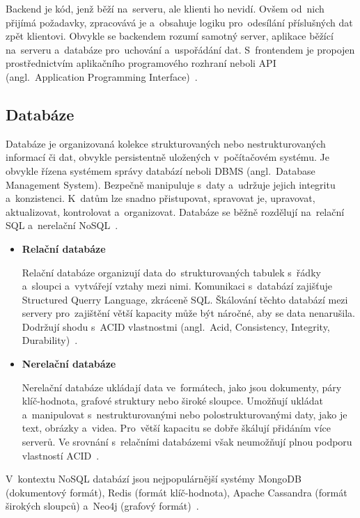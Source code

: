 \documentclass[twoside]{ctuthesis}
\begin{document}
Backend je kód, jenž běží na~serveru, ale klienti ho nevidí. Ovšem od~nich přijímá požadavky, zpracovává je a~obsahuje logiku pro~odesílání příslušných dat zpět klientovi. Obvykle se backendem rozumí samotný server, aplikace běžící na~serveru a~databáze pro~uchování a~uspořádání dat. S~frontendem je propojen prostřednictvím aplikačního programového rozhraní neboli API (angl.~Application Programming Interface)~\cite{codecademy}.

\subsection{Databáze}

Databáze je organizovaná kolekce strukturovaných nebo nestrukturovaných informací či dat, obvykle persistentně uložených v~počítačovém systému. Je obvykle řízena systémem správy databází neboli DBMS (angl.~Database Management System). Bezpečně manipuluje s~daty a~udržuje jejich integritu a~konzistenci. K~datům lze snadno přistupovat, spravovat je, upravovat, aktualizovat, kontrolovat a~organizovat. Databáze se běžně rozdělují na~relační SQL a~nerelační NoSQL~\cite{ordat, altex}.

\begin{itemize}
\item \textbf{Relační databáze}

Relační databáze organizují data do~strukturovaných tabulek s~řádky a~sloupci a~vytvářejí vztahy mezi nimi. Komunikaci s~databází zajišťuje Structured Querry Language, zkráceně SQL. Škálování těchto databází mezi servery pro~zajištění větší kapacity může být náročné, aby se data nenarušila. Dodržují shodu s~ACID vlastnostmi (angl.~Acid, Consistency, Integrity, Durability)~\cite{altex}.

\newpage

\item \textbf{Nerelační databáze}

Nerelační databáze ukládají data ve~formátech, jako jsou dokumenty, páry klíč-hodnota, grafové struktury nebo široké sloupce. Umožňují ukládat a~manipulovat s~nestrukturovanými nebo polostrukturovanými daty, jako je text, obrázky a~videa. Pro~větší kapacitu se dobře škálují přidáním více serverů. Ve srovnání s~relačními databázemi však neumožňují plnou podporu vlastností ACID~\cite{altex}.
\end{itemize}

V~kontextu NoSQL databází jsou nejpopulárnější systémy MongoDB (dokumentový formát), Redis (formát klíč-hodnota), Apache Cassandra (formát širokých sloupců) a~Neo4j (grafový formát)~\cite{dbengines}.
\end{document}
